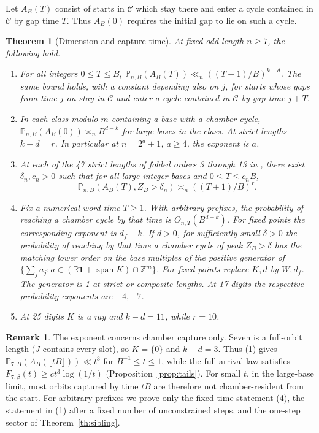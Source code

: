 \documentclass[11pt]{amsart}
\newtheorem{theorem}{Theorem}
\theoremstyle{definition}
\newtheorem*{remark}{Remark}
\newcommand{\Z}{\mathbb Z}
\newcommand{\R}{\mathbb R}
\newcommand{\PP}{\mathbb P}
\newcommand{\one}{\mathbf 1}
\newcommand{\C}{\mathcal C}
\begin{document}
Let \(A_B(T)\) consist of starts in \(\C\) which stay there and enter
a cycle contained in \(\C\) by gap time \(T\).
Thus \(A_B(0)\) requires the initial gap to lie on such a cycle.

\begin{theorem}[Dimension and capture time]\label{th:clock}
At fixed odd length \(n\ge7\), the following hold.
\begin{enumerate}
\item For all integers \(0\le T\le B\),
\(\PP_{n,B}(A_B(T))\ll_n ((T+1)/B)^{k-d}\).
The same bound holds, with a constant depending also on \(j\), for
starts whose gaps from time \(j\) on stay in \(\C\) and enter a cycle
contained in \(\C\) by gap time \(j+T\).
\item In each class modulo \(m\) containing a base with a chamber cycle,
\(\PP_{n,B}(A_B(0))\asymp_n B^{d-k}\) for large bases in the class.
At strict lengths \(k-d=r\). In particular at \(n=2^a\pm1\), \(a\ge4\),
the exponent is \(a\).
\item At each of the 47 strict lengths of folded orders 3 through 13
in \cite{G9}, there exist \(\delta_n,c_n>0\) such that for all
large integer bases and \(0\le T\le c_n B\),
\[
 \PP_{n,B}(A_B(T),Z_B>\delta_n)\asymp_n ((T+1)/B)^r.
\]
\item Fix a numerical-word time \(T\ge1\). With arbitrary prefixes,
the probability of reaching a chamber cycle by that time is
\(O_{n,T}(B^{d-k})\).
For fixed points the corresponding exponent is \(d_f-k\).
If \(d>0\), for sufficiently small \(\delta>0\) the probability of
reaching by that time a chamber cycle of peak \(Z_B>\delta\) has the
matching lower order on the base multiples of the positive
generator of \(\{\sum_j a_j:a\in
(\R\one+\operatorname{span}K)\cap\Z^m\}\).
For fixed points replace \(K,d\) by \(W,d_f\).
The generator is 1 at strict or composite lengths. At 17 digits the
respective probability exponents are \(-4,-7\).
\item At 25 digits \(K\) is a ray and \(k-d=11\), while \(r=10\).
\end{enumerate}
\end{theorem}

\begin{remark}
The exponent concerns chamber capture only. Seven is a full-orbit length
(\(J\) contains every slot), so \(K=\{0\}\) and \(k-d=3\). Thus (1)
gives \(\PP_{7,B}(A_B(\lfloor tB\rfloor))\ll t^3\) for
\(B^{-1}\le t\le1\), while the full arrival law satisfies
\(F_{7,\beta}(t)\ge ct^3\log(1/t)\) (Proposition~\ref{prop:tails}). For
small \(t\), in the large-base limit, most orbits captured by time
\(tB\) are therefore not chamber-resident from the start. For arbitrary
prefixes we prove only the fixed-time statement (4), the statement in
(1) after a fixed number of unconstrained steps, and the one-step sector
of Theorem~\ref{th:sibling}.
\end{remark}
\end{document}
